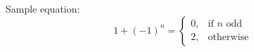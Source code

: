 Sample equation:
$$
1+(-1)^n=\begin{cases}
            0, & \text{if $n$ odd}\\
            2, & \text{otherwise}
            \end{cases}
$$
